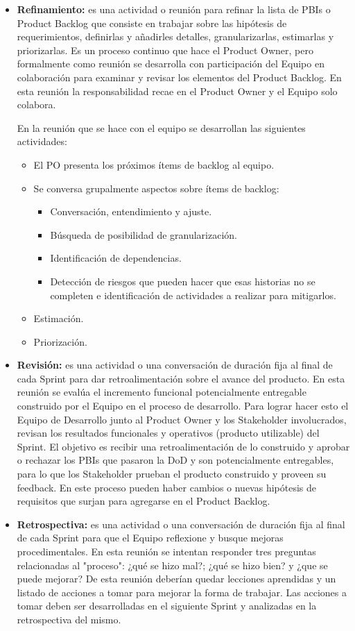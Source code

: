 \begin{itemize}
\item \textbf{Refinamiento:} es una actividad o reunión para refinar la lista de PBIs o Product Backlog que consiste en trabajar sobre las hipótesis de requerimientos, definirlas y añadirles detalles, granularizarlas, estimarlas y priorizarlas. Es un proceso continuo que hace el Product Owner, pero formalmente como reunión se desarrolla con participación del Equipo en colaboración para examinar y revisar los elementos del Product Backlog. En esta reunión la responsabilidad recae en el Product Owner y el Equipo solo colabora.

En la reunión que se hace con el equipo se desarrollan las siguientes actividades:
  \begin{itemize}
  \item{El PO presenta los próximos ítems de backlog al equipo.}
  \item{Se conversa grupalmente aspectos sobre ítems de backlog: }
    \begin{itemize}
    \item{Conversación, entendimiento y ajuste.}
    \item{Búsqueda de posibilidad de granularización.}
    \item{Identificación de dependencias.}
    \item{Detección de riesgos que pueden hacer que esas historias no se completen e identificación de actividades a realizar para mitigarlos.}
    \end{itemize}
  \item{Estimación.}
  \item{Priorización.}
  \end{itemize}

\item \textbf{Revisión:} es una actividad o una conversación de duración fija al final de cada Sprint para dar retroalimentación sobre el avance del producto. En esta reunión se evalúa el incremento funcional potencialmente entregable construido por el Equipo en el proceso de desarrollo. Para lograr hacer esto el Equipo de Desarrollo junto al Product Owner y los Stakeholder involucrados, revisan los resultados funcionales y operativos (producto utilizable) del Sprint. El objetivo es recibir una retroalimentación de lo construido y aprobar o rechazar los PBIs que pasaron la DoD y son potencialmente entregables, para lo que los Stakeholder prueban el producto construido y proveen su feedback. En este proceso pueden haber cambios o nuevas hipótesis de requisitos que surjan para agregarse en el Product Backlog.

\item \textbf{Retrospectiva:} es una actividad o una conversación de duración fija al final de cada Sprint para que el Equipo reflexione y busque mejoras procedimentales. En esta reunión se intentan responder tres preguntas relacionadas al "proceso": ¿qué se hizo mal?; ¿qué se hizo bien? y ¿que se puede mejorar?
De esta reunión deberían quedar lecciones aprendidas y un listado de acciones a tomar para mejorar la forma de trabajar. Las acciones a tomar deben ser desarrolladas en el siguiente Sprint y analizadas en la retrospectiva del mismo.

\end{itemize}


